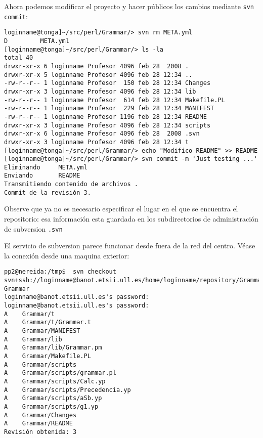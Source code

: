 
Ahora podemos modificar el proyecto y hacer públicos los cambios 
mediante \verb|svn commit|:
\begin{verbatim}
loginname@tonga]~/src/perl/Grammar/> svn rm META.yml
D         META.yml
[loginname@tonga]~/src/perl/Grammar/> ls -la
total 40
drwxr-xr-x 6 loginname Profesor 4096 feb 28  2008 .
drwxr-xr-x 5 loginname Profesor 4096 feb 28 12:34 ..
-rw-r--r-- 1 loginname Profesor  150 feb 28 12:34 Changes
drwxr-xr-x 3 loginname Profesor 4096 feb 28 12:34 lib
-rw-r--r-- 1 loginname Profesor  614 feb 28 12:34 Makefile.PL
-rw-r--r-- 1 loginname Profesor  229 feb 28 12:34 MANIFEST
-rw-r--r-- 1 loginname Profesor 1196 feb 28 12:34 README
drwxr-xr-x 3 loginname Profesor 4096 feb 28 12:34 scripts
drwxr-xr-x 6 loginname Profesor 4096 feb 28  2008 .svn
drwxr-xr-x 3 loginname Profesor 4096 feb 28 12:34 t
[loginname@tonga]~/src/perl/Grammar/> echo "Modifico README" >> README
[loginname@tonga]~/src/perl/Grammar/> svn commit -m 'Just testing ...'
Eliminando     META.yml
Enviando       README
Transmitiendo contenido de archivos .
Commit de la revisión 3.
\end{verbatim}
Observe que ya no es necesario especificar el lugar en el que se encuentra
el repositorio: esa información esta guardada en los subdirectorios
de administración de subversion \verb|.svn|

El servicio de subversion parece funcionar desde fuera de la red del centro.
Véase la conexión desde una maquina exterior:

\begin{verbatim}
pp2@nereida:/tmp$  svn checkout svn+ssh://loginname@banot.etsii.ull.es/home/loginname/repository/Grammar Grammar
loginname@banot.etsii.ull.es's password:
loginname@banot.etsii.ull.es's password:
A    Grammar/t
A    Grammar/t/Grammar.t
A    Grammar/MANIFEST
A    Grammar/lib
A    Grammar/lib/Grammar.pm
A    Grammar/Makefile.PL
A    Grammar/scripts
A    Grammar/scripts/grammar.pl
A    Grammar/scripts/Calc.yp
A    Grammar/scripts/Precedencia.yp
A    Grammar/scripts/aSb.yp
A    Grammar/scripts/g1.yp
A    Grammar/Changes
A    Grammar/README
Revisión obtenida: 3
\end{verbatim}


